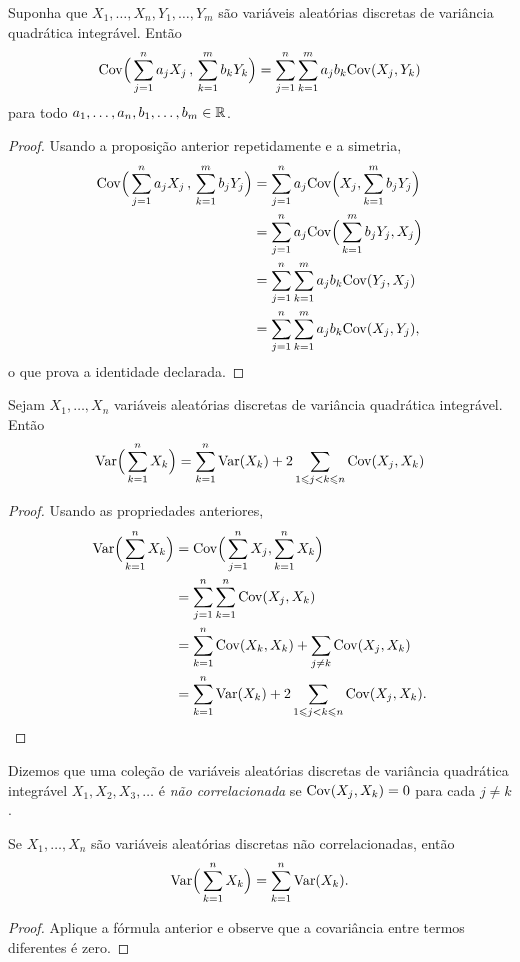 \begin{corollary}
Suponha que $ X_1, \dots, X_n, Y_1, \dots, Y_m $ são variáveis aleatórias discretas de variância quadrática integrável. Então
\[
\mathrm{Cov} \Big(\sum_{j=1}^n a_j X_j \,,\, \sum_{k=1}^m b_k Y_k\Big)
=
\sum_{j=1}^n \sum_{k=1}^m a_j b_k \mathrm{Cov}( X_j , Y_k )
\]
para todo $ a_1, \dots, a_n, b_1, \dots, b_m \in \mathbb{R} $.
\end{corollary}
\begin{proof}
Usando a proposição anterior repetidamente e a simetria,
\begin{align}
\mathrm{Cov}\Big(\sum_{j=1}^n a_j X_j \,,\, \sum_{k=1}^m b_j Y_j\Big)
& =
\sum_{j=1}^n a_j \mathrm{Cov}\Big( X_j , \sum_{k=1}^m  b_j Y_j\Big)
\\
& =
\sum_{j=1}^n a_j \mathrm{Cov}\Big( \sum_{k=1}^m  b_j Y_j , X_j\Big)
\\
& =
\sum_{j=1}^n \sum_{k=1}^m a_j b_k \mathrm{Cov}( Y_j, X_j)
\\
& =
\sum_{j=1}^n \sum_{k=1}^m a_j b_k \mathrm{Cov}( X_j , Y_j)
,
\end{align}
o que prova a identidade declarada.
\end{proof}

\begin{corollary}
Sejam $ X_1, \dots, X_n $ variáveis aleatórias discretas de variância quadrática integrável. Então
\[
\mathrm{Var}\Big(\sum_{k=1}^n X_k\Big)
=
\sum_{k=1}^n \mathrm{Var}(X_k) + 2 \sum_{1 \leqslant j<k \leqslant n} \mathrm{Cov}(X_j,X_k)
\]
\end{corollary}
\begin{proof}
Usando as propriedades anteriores,
\begin{align}
\mathrm{Var}\Big(\sum_{k=1}^n X_k\Big)
& =
\mathrm{Cov}\Big(\sum_{j=1}^n X_j, \sum_{k=1}^n X_k\Big)
\\
& =
\sum_{j=1}^n \sum_{k=1}^n \mathrm{Cov}( X_j, X_k)
\\
& =
\sum_{k=1}^n \mathrm{Cov}( X_k, X_k)
+
\sum_{j\ne k} \mathrm{Cov}( X_j, X_k)
\\
& =
\sum_{k=1}^n \mathrm{Var}( X_k)
+
2
\sum_{1 \leqslant j < k \leqslant n} \mathrm{Cov}( X_j, X_k)
.
\qedhere
\end{align}
\end{proof}

\begin{definition}
\label{def:uncorrelated}
Dizemos que uma coleção de variáveis aleatórias discretas de variância quadrática integrável $ X_1, X_2, X_3, \dots $ é \emph{não correlacionada} se $ \mathrm{Cov} (X_j, X_k) = 0 $ para cada $ j \ne k $.
\end{definition}

\begin{corollary}
\label{cor:uncorrelated}
Se $ X_1, \dots, X_n $ são variáveis aleatórias discretas não correlacionadas, então
\[
\mathrm{Var}\Big(\sum_{k=1}^n X_k\Big)
=
\sum_{k=1}^n \mathrm{Var}(X_k)
.
\]
\end{corollary}
\begin{proof}
Aplique a fórmula anterior e observe que a covariância entre termos diferentes é zero.
\end{proof}

